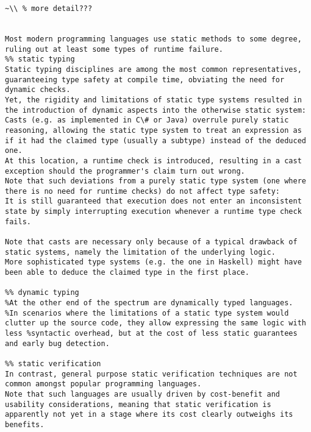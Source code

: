 
\begin{verbatim}
~\\ % more detail???


Most modern programming languages use static methods to some degree, ruling out at least some types of runtime failure.
%% static typing
Static typing disciplines are among the most common representatives, guaranteeing type safety at compile time, obviating the need for dynamic checks.
Yet, the rigidity and limitations of static type systems resulted in the introduction of dynamic aspects into the otherwise static system:
Casts (e.g. as implemented in C\# or Java) overrule purely static reasoning, allowing the static type system to treat an expression as if it had the claimed type (usually a subtype) instead of the deduced one.
At this location, a runtime check is introduced, resulting in a cast exception should the programmer's claim turn out wrong.
Note that such deviations from a purely static type system (one where there is no need for runtime checks) do not affect type safety:
It is still guaranteed that execution does not enter an inconsistent state by simply interrupting execution whenever a runtime type check fails.

Note that casts are necessary only because of a typical drawback of static systems, namely the limitation of the underlying logic.
More sophisticated type systems (e.g. the one in Haskell) might have been able to deduce the claimed type in the first place.

%% dynamic typing
%At the other end of the spectrum are dynamically typed languages.
%In scenarios where the limitations of a static type system would clutter up the source code, they allow expressing the same logic with less %syntactic overhead, but at the cost of less static guarantees and early bug detection.

%% static verification
In contrast, general purpose static verification techniques are not common amongst popular programming languages.
Note that such languages are usually driven by cost-benefit and usability considerations, meaning that static verification is apparently not yet in a stage where its cost clearly outweighs its benefits.
\end{verbatim}

